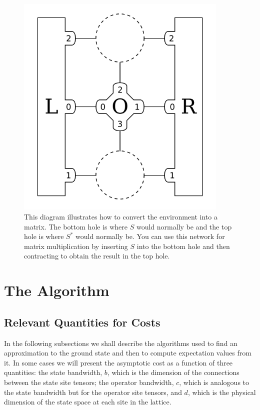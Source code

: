 \documentclass{article}
\newcommand{\diagramwidth}{4in}
\begin{document}
\begin{figure}\begin{center}
\includegraphics[width=\diagramwidth]{drawings/matmul-car}
\caption{\label{fig:matmul-car}This diagram illustrates how to convert the environment into a matrix.  The bottom hole is where $S$ would normally be and the top hole is where $S^*$ would normally be.  You can use this network for matrix multiplication by inserting $S$ into the bottom hole and then contracting to obtain the result in the top hole.}
\end{center}\end{figure}

\clearpage

\section{The Algorithm}

\subsection{Relevant Quantities for Costs}

In the following subsections we shall describe the algorithms used to find an approximation to the ground state and then to compute expectation values from it.  In some cases we will present the asymptotic cost as a function of three quantities: the state bandwidth, $b$, which is the dimension of the connections between the state site tensors; the operator bandwidth, $c$, which is analogous to the state bandwidth but for the operator site tensors, and $d$, which is the physical dimension of the state space at each site in the lattice.
\end{document}
